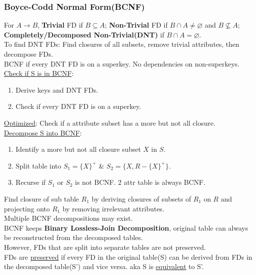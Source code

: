 \begin{multicols*}{3}
\subsubsection{Boyce-Codd Normal Form(BCNF)}
For $A\rightarrow B$, \textbf{Trivial} FD if $B\subseteq A$; \textbf{Non-Trivial} FD if $B \cap A \neq \varnothing$ and $B \nsubseteq A$; \textbf{Completely/Decomposed Non-Trivial(DNT)} if $B \cap A = \varnothing$.\\
To find DNT FDs: Find closures of all subsets, remove trivial attributes, then decompose FDs.\\
BCNF if every DNT FD is on a superkey. No dependencies on non-superkeys.\\
\underline{Check if S is in BCNF}: 
\begin{enumerate}[leftmargin=*]
    \item Derive keys and DNT FDs.
    \item Check if every DNT FD is on a superkey.
\end{enumerate}
\underline{Optimized}: Check if a attribute subset has a more but not all closure.\\
\underline{Decompose S into BCNF}: 
\begin{enumerate}[leftmargin=*]
    \item Identify a more but not all closure subset $X$ in $S$.
    \item   Split table into $S_1=\{X\}^+$ \& $S_2=\{X, $$R-\{X\}^+\}$.
    \item  Recurse if $S_1$ or $S_2$ is not BCNF. 2 attr table is always BCNF.
\end{enumerate}
Find closure of sub table $R_1$ by deriving closures of subsets of $R_1$ on $R$ and projecting onto $R_1$ by removing irrelevant attributes. \\
Multiple BCNF decompositions may exist.\\
BCNF keeps \textbf{Binary Lossless-Join Decomposition}, original table can always be reconstructed from the decomposed tables.\\
However, FDs that are split into separate tables are not preserved.\\
FDs are \underline{preserved} if every FD in the original table(S) can be derived from FDs in the decomposed table(S') and vice versa. aka S is \underline{equivalent} to S'.\\


\end{multicols*}
